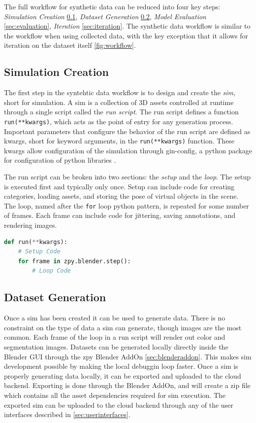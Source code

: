 \documentclass{article}
\begin{document}
The full workflow for synthetic data can be reduced into four key steps: \emph{Simulation Creation} \ref{sec:worflowsimcreation}, \emph{Dataset Generation} \ref{sec:generation}, \emph{Model Evaluation} \ref{sec:evaluation}, \emph{Iteration} \ref{sec:iteration}. The synthetic data workflow is similar to the workflow when using collected data, with the key exception that it allows for iteration on the dataset itself \ref{fig:workflow}.

\subsection{Simulation Creation}
\label{sec:worflowsimcreation}

The first step in the syntehtic data workflow is to design and create the \emph{sim}, short for simulation. A sim is a collection of 3D assets controlled at runtime through a single script called the \emph{run script}. The run script defines a function \lstinline{run(**kwargs)}, which acts as the point of entry for any generation process. Important parameters that configure the behavior of the run script are defined as kwargs, short for keyword arguments, in the \lstinline{run(**kwargs)} function. These kwargs allow configuration of the simulation through gin-config, a python package for configuration of python libraries \cite{ginconfig}.

The run script can be broken into two sections: the \emph{setup} and the \emph{loop}. The setup is executed first and typically only once. Setup can include code for creating categories, loading assets, and storing the pose of virtual objects in the scene. The loop, named after the \lstinline{for} loop python pattern, is repeated for some number of frames. Each frame can include code for jittering, saving annotations, and rendering images.

\begin{lstlisting}[language=Python,caption={Basic structure of the run function in a sim run script.},label={lst:setuploop}]
def run(**kwargs):
	# Setup Code
	for frame in zpy.blender.step():
		# Loop Code
\end{lstlisting}


\subsection{Dataset Generation}
\label{sec:generation}

Once a sim has been created it can be used to generate data. There is no constraint on the type of data a sim can generate, though images are the most common. Each frame of the loop in a run script will render out color and segmentation images. Datasets can be generated locally directly inside the Blender GUI through the zpy Blender AddOn \ref{sec:blenderaddon}. This makes sim development possible by making the local debuggin loop faster. Once a sim is properly generating data locally, it can be exported and uploaded to the cloud backend. Exporting is done through the Blender AddOn, and will create a zip file which contains all the asset dependencies required for sim execution. The exported sim can be uploaded to the cloud backend through any of the user interfaces described in \ref{sec:userinterfaces}.
\end{document}
